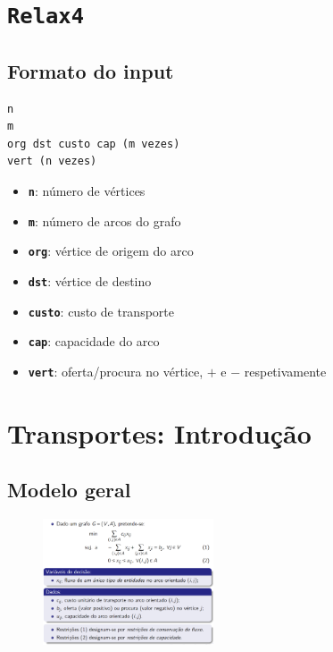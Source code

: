 \documentclass[10pt, a4paper]{article}
\begin{document}
 
\begin{multicols}{2}

\begin{center}
\end{center}

\thispagestyle{empty}



\section{\texttt{Relax4}}

\subsection{Formato do input}

\begin{lstlisting}
n
m
org dst custo cap (m vezes)
vert (n vezes)
\end{lstlisting}

\begin{itemize}
    \item \textbf{\texttt{n}}: número de vértices
    \item \textbf{\texttt{m}}: número de arcos do grafo
    \item \textbf{\texttt{org}}: vértice de origem do arco
    \item \textbf{\texttt{dst}}: vértice de destino
    \item \textbf{\texttt{custo}}: custo de transporte
    \item \textbf{\texttt{cap}}: capacidade do arco
    \item \textbf{\texttt{vert}}: oferta/procura no vértice, \(+\) e \(-\) respetivamente
\end{itemize}



\section{Transportes: Introdução}

\subsection{Modelo geral}

\begin{figure}[H]
    \centering
    \includegraphics[width=0.45\textwidth]{modelo_geral_transportes.png}
\end{figure}


\end{multicols}
\end{document}
